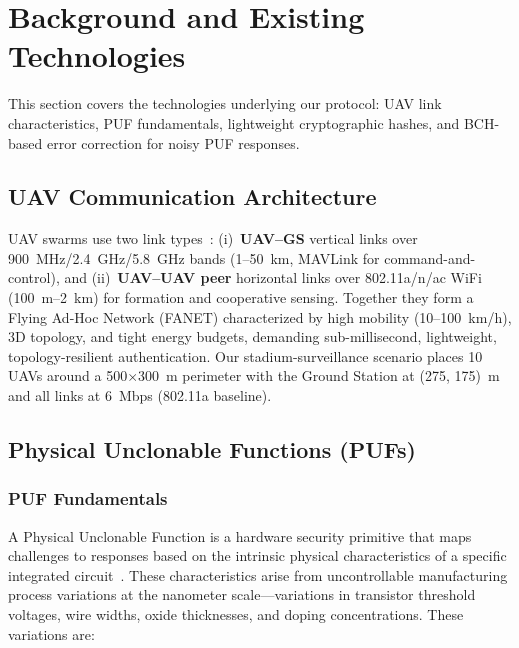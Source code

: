 \documentclass[11pt,a4paper]{article}
\begin{document}
\section{Background and Existing Technologies}
\label{sec:background}

This section covers the technologies underlying our protocol: UAV link characteristics, PUF fundamentals, lightweight cryptographic hashes, and BCH-based error correction for noisy PUF responses.

\subsection{UAV Communication Architecture}

UAV swarms use two link types~\cite{securing_uav_fanet}: (i)~\textbf{UAV--GS} vertical links over 900~MHz/2.4~GHz/5.8~GHz bands (1--50~km, MAVLink for command-and-control), and (ii)~\textbf{UAV--UAV peer} horizontal links over 802.11a/n/ac WiFi (100~m--2~km) for formation and cooperative sensing. Together they form a Flying Ad-Hoc Network (FANET) characterized by high mobility (10--100~km/h), 3D topology, and tight energy budgets, demanding sub-millisecond, lightweight, topology-resilient authentication. Our stadium-surveillance scenario places 10 UAVs around a 500$\times$300~m perimeter with the Ground Station at (275, 175)~m and all links at 6~Mbps (802.11a baseline).

\subsection{Physical Unclonable Functions (PUFs)}
\label{subsec:puf_background}

\subsubsection{PUF Fundamentals}

A Physical Unclonable Function is a hardware security primitive that maps challenges to responses based on the intrinsic physical characteristics of a specific integrated circuit~\cite{puf_overview}. These characteristics arise from uncontrollable manufacturing process variations at the nanometer scale---variations in transistor threshold voltages, wire widths, oxide thicknesses, and doping concentrations. These variations are:
\end{document}

